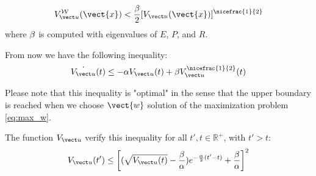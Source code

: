 \begin{equation}
\Vwu(\vect{x}) < \frac{\Bu}{2} [\Vu(\vect{x})]^{\nicefrac{1}{2}}
\end{equation}
where $\beta$ is computed with eigenvalues of $E$, $P$, and $R$.

From now we have the following inequality:
\begin{equation}
\dot{\Vu}(t) \leq -\alpha \Vu(t) + \Bu \Vu^{\nicefrac{1}{2}}(t)
\end{equation}

Please note that this inequality is "optimal" in the sense that the upper boundary is reached when  we choose $\vect{w}$ solution of the maximization problem \ref{eq:max_w}.

\begin{prop} \label{ineq:lyap}
The function $\Vu$ verify this inequality for all $t',t \in \mathbb{R}^+$, with $t'>t$:
\begin{equation}
\Vu(t') \leq  \left[ (\sqrt{\Vu(t)} - \frac{\Bu}{\alpha}) e^{-\frac{\alpha}{2} (t'-t)} + \frac{\Bu}{\alpha} \right] ^2
\end{equation} 
\end{prop}

